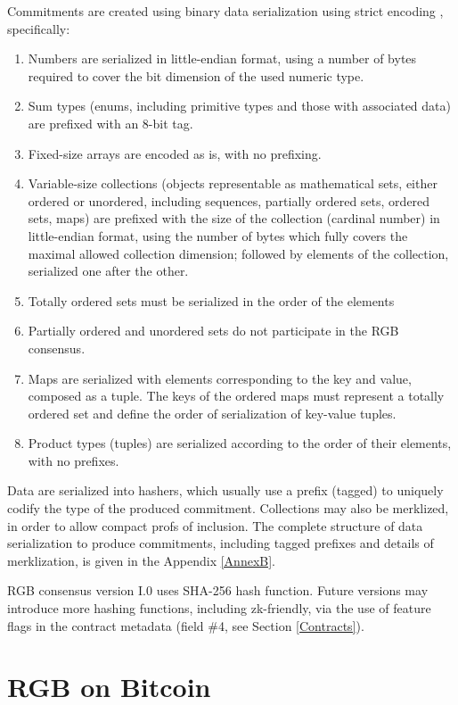 \documentclass[9pt,oneside]{amsart}
\begin{document}
\begin{multicols}{2}
Commitments are created using binary data serialization using strict encoding \cite{strict},
specifically:
\begin{enumerate}
\item Numbers are serialized in little-endian format,
   using a number of bytes required to cover the bit dimension of the used numeric type.
\item Sum types (enums, including primitive types and those with associated data)
   are prefixed with an 8-bit tag.
\item Fixed-size arrays are encoded as is, with no prefixing.
\item Variable-size collections (objects representable as mathematical sets,
   either ordered or unordered, including sequences, partially ordered sets, ordered sets, maps)
   are prefixed with the size of the collection (cardinal number) in little-endian format,
   using the number of bytes which fully covers the maximal allowed collection dimension;
   followed by elements of the collection, serialized one after the other.
\item Totally ordered sets must be serialized in the order of the elements
\item Partially ordered and unordered sets do not participate in the RGB consensus.
\item Maps are serialized with elements corresponding to the key and value, composed as a tuple.
   The keys of the ordered maps must represent a totally ordered set
   and define the order of serialization of key-value tuples.
\item Product types (tuples) are serialized according to the order of their elements,
   with no prefixes.
\end{enumerate}

Data are serialized into hashers, which usually use a prefix (tagged) to uniquely codify
the type of the produced commitment. Collections may also be merklized, in order to allow
compact profs of inclusion. The complete structure of data serialization to produce commitments,
including tagged prefixes and details of merklization, is given in the Appendix \ref{AnnexB}.

RGB consensus version I.0 uses SHA-256 hash function.
Future versions may introduce more hashing functions, including zk-friendly,
via the use of feature flags in the contract metadata (field \#4, see Section \ref{Contracts}).


\section{RGB on Bitcoin}


\end{multicols}
\end{document}
